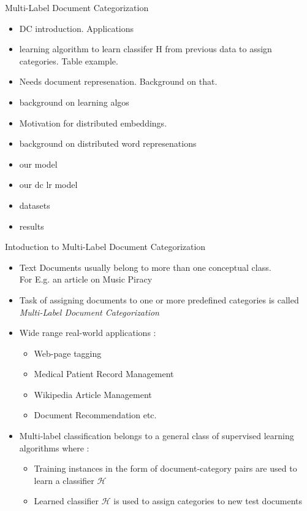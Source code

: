 \documentclass[10pt]{beamer}
\begin{document}
\begin{frame}{Multi-Label Document Categorization}
\begin{itemize}
	\vfill\item DC introduction. Applications
	\vfill\item learning algorithm to learn classifer H from previous data to assign categories. Table example.
	\vfill\item Needs document represenation. Background on that.
	\vfill\item background on learning algos
	\vfill\item Motivation for distributed embeddings.
	\vfill\item background on distributed word represenations
	\vfill\item our model
	\vfill\item our dc lr model
	\vfill\item datasets
	\vfill\item results
\end{itemize}
\end{frame}



\begin{frame}{Intoduction to Multi-Label Document Categorization}
\begin{itemize}
	\vfill\item<1-> Text Documents usually belong to more than one conceptual class. \\For E.g. an article on Music Piracy 
	\vfill\item<2-> Task of assigning documents to one or more predefined categories is called \emph{Multi-Label Document Categorization}
	\vfill\item<3-> Wide range real-world applications :
	\begin{itemize} 
	  \vfill\item<3-> Web-page tagging
	  \vfill\item<3-> Medical Patient Record Management
	  \vfill\item<3-> Wikipedia Article Management
	  \vfill\item<3-> Document Recommendation etc.
	\end{itemize} 
	\vfill\item<4-> Multi-label classification belongs to a general class of supervised learning algorithms where : 
	\begin{itemize}
	  \vfill\item<5-> Training instances in the form of document-category pairs are used to learn a classifier $\mathcal{H}$ 
	  \vfill\item<6-> Learned classifier $\mathcal{H}$ is used to assign categories to new test documents
	\end{itemize}
\end{itemize}
\vfill
\end{frame}
\end{document}
